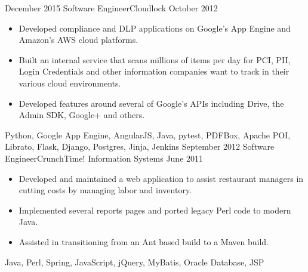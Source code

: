 \begin{experiences}
\emptySeparator
  \experience
  {December 2015}  {Software Engineer}{Cloudlock}
  {October 2012}   {
                      \begin{itemize}
                        \item Developed compliance and DLP applications on Google's App Engine and Amazon's AWS cloud platforms.
                        \item Built an internal service that scans millions of items per day for PCI, PII, Login Credentials and other information companies want to track in their various cloud environments.
                        \item Developed features around several of Google's APIs including Drive, the Admin SDK, Google+ and others.
                      \end{itemize}
                  }
                  {Python, Google App Engine, AngularJS, Java, pytest, PDFBox, Apache POI, Librato, Flask, Django, Postgres, Jinja, Jenkins}
\emptySeparator
  \experience
  {September 2012}  {Software Engineer}{CrunchTime! Information Systems}
  {June 2011}   {
                      \begin{itemize}
                        \item Developed and maintained a web application to assist restaurant managers in cutting costs by managing labor and inventory.
                        \item Implemented several reports pages and ported legacy Perl code to modern Java.   
                        \item Assisted in transitioning from an Ant based build to a Maven build.
                      \end{itemize}
                  }
                  {Java, Perl, Spring, JavaScript, jQuery, MyBatis, Oracle Database, JSP}
\end{experiences}
